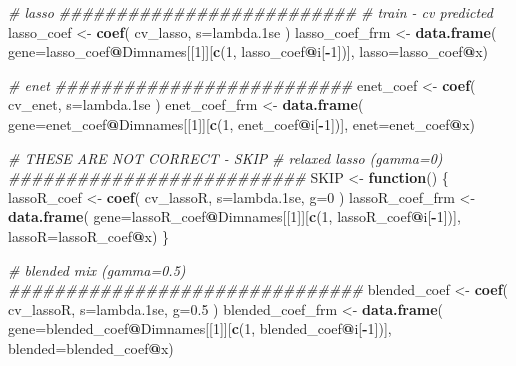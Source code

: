 \documentclass[
]{book}
\newenvironment{Shaded}{\begin{snugshade}}{\end{snugshade}}
\newcommand{\CommentTok}[1]{\textcolor[rgb]{0.56,0.35,0.01}{\textit{#1}}}
\newcommand{\ControlFlowTok}[1]{\textcolor[rgb]{0.13,0.29,0.53}{\textbf{#1}}}
\newcommand{\DataTypeTok}[1]{\textcolor[rgb]{0.13,0.29,0.53}{#1}}
\newcommand{\DecValTok}[1]{\textcolor[rgb]{0.00,0.00,0.81}{#1}}
\newcommand{\FloatTok}[1]{\textcolor[rgb]{0.00,0.00,0.81}{#1}}
\newcommand{\KeywordTok}[1]{\textcolor[rgb]{0.13,0.29,0.53}{\textbf{#1}}}
\newcommand{\NormalTok}[1]{#1}
\newcommand{\OperatorTok}[1]{\textcolor[rgb]{0.81,0.36,0.00}{\textbf{#1}}}
\newcommand{\StringTok}[1]{\textcolor[rgb]{0.31,0.60,0.02}{#1}}
\begin{document}
\begin{Shaded}
\begin{Highlighting}[]
\CommentTok{\# lasso }
\CommentTok{\#\#\#\#\#\#\#\#\#\#\#\#\#\#\#\#\#\#\#\#\#\#\#\#\#\#}
\CommentTok{\# train {-} cv predicted}
\NormalTok{lasso\_coef <{-}}\StringTok{ }\KeywordTok{coef}\NormalTok{(}
\NormalTok{ cv\_lasso,}
 \DataTypeTok{s=}\StringTok{\textquotesingle{}lambda.1se\textquotesingle{}}
\NormalTok{)}
\NormalTok{lasso\_coef\_frm <{-}}\StringTok{ }\KeywordTok{data.frame}\NormalTok{(}
 \DataTypeTok{gene=}\NormalTok{lasso\_coef}\OperatorTok{@}\NormalTok{Dimnames[[}\DecValTok{1}\NormalTok{]][}\KeywordTok{c}\NormalTok{(}\DecValTok{1}\NormalTok{, lasso\_coef}\OperatorTok{@}\NormalTok{i[}\OperatorTok{{-}}\DecValTok{1}\NormalTok{])],}
 \DataTypeTok{lasso=}\NormalTok{lasso\_coef}\OperatorTok{@}\NormalTok{x)}


\CommentTok{\# enet}
\CommentTok{\#\#\#\#\#\#\#\#\#\#\#\#\#\#\#\#\#\#\#\#\#\#\#\#\#\#}
\NormalTok{enet\_coef <{-}}\StringTok{ }\KeywordTok{coef}\NormalTok{(}
\NormalTok{ cv\_enet,}
 \DataTypeTok{s=}\StringTok{\textquotesingle{}lambda.1se\textquotesingle{}}
\NormalTok{)}
\NormalTok{enet\_coef\_frm <{-}}\StringTok{ }\KeywordTok{data.frame}\NormalTok{(}
 \DataTypeTok{gene=}\NormalTok{enet\_coef}\OperatorTok{@}\NormalTok{Dimnames[[}\DecValTok{1}\NormalTok{]][}\KeywordTok{c}\NormalTok{(}\DecValTok{1}\NormalTok{, enet\_coef}\OperatorTok{@}\NormalTok{i[}\OperatorTok{{-}}\DecValTok{1}\NormalTok{])],}
 \DataTypeTok{enet=}\NormalTok{enet\_coef}\OperatorTok{@}\NormalTok{x)}

\CommentTok{\# THESE ARE NOT CORRECT {-} SKIP}
\CommentTok{\# relaxed lasso (gamma=0)}
\CommentTok{\#\#\#\#\#\#\#\#\#\#\#\#\#\#\#\#\#\#\#\#\#\#\#\#\#\#}
\NormalTok{SKIP <{-}}\StringTok{ }\ControlFlowTok{function}\NormalTok{() \{}
\NormalTok{lassoR\_coef <{-}}\StringTok{ }\KeywordTok{coef}\NormalTok{(}
\NormalTok{ cv\_lassoR,}
 \DataTypeTok{s=}\StringTok{\textquotesingle{}lambda.1se\textquotesingle{}}\NormalTok{,}
 \DataTypeTok{g=}\DecValTok{0}
\NormalTok{)}
\NormalTok{lassoR\_coef\_frm <{-}}\StringTok{ }\KeywordTok{data.frame}\NormalTok{(}
 \DataTypeTok{gene=}\NormalTok{lassoR\_coef}\OperatorTok{@}\NormalTok{Dimnames[[}\DecValTok{1}\NormalTok{]][}\KeywordTok{c}\NormalTok{(}\DecValTok{1}\NormalTok{, lassoR\_coef}\OperatorTok{@}\NormalTok{i[}\OperatorTok{{-}}\DecValTok{1}\NormalTok{])],}
 \DataTypeTok{lassoR=}\NormalTok{lassoR\_coef}\OperatorTok{@}\NormalTok{x)}
\NormalTok{\}}

\CommentTok{\# blended mix (gamma=0.5)}
\CommentTok{\#\#\#\#\#\#\#\#\#\#\#\#\#\#\#\#\#\#\#\#\#\#\#\#\#\#\#\#\#\#\#}
\NormalTok{blended\_coef <{-}}\StringTok{ }\KeywordTok{coef}\NormalTok{(}
\NormalTok{ cv\_lassoR,}
 \DataTypeTok{s=}\StringTok{\textquotesingle{}lambda.1se\textquotesingle{}}\NormalTok{,}
 \DataTypeTok{g=}\FloatTok{0.5}
\NormalTok{)}
\NormalTok{blended\_coef\_frm <{-}}\StringTok{ }\KeywordTok{data.frame}\NormalTok{(}
 \DataTypeTok{gene=}\NormalTok{blended\_coef}\OperatorTok{@}\NormalTok{Dimnames[[}\DecValTok{1}\NormalTok{]][}\KeywordTok{c}\NormalTok{(}\DecValTok{1}\NormalTok{, blended\_coef}\OperatorTok{@}\NormalTok{i[}\OperatorTok{{-}}\DecValTok{1}\NormalTok{])],}
 \DataTypeTok{blended=}\NormalTok{blended\_coef}\OperatorTok{@}\NormalTok{x)}



\end{Highlighting}
\end{Shaded}
\end{document}
